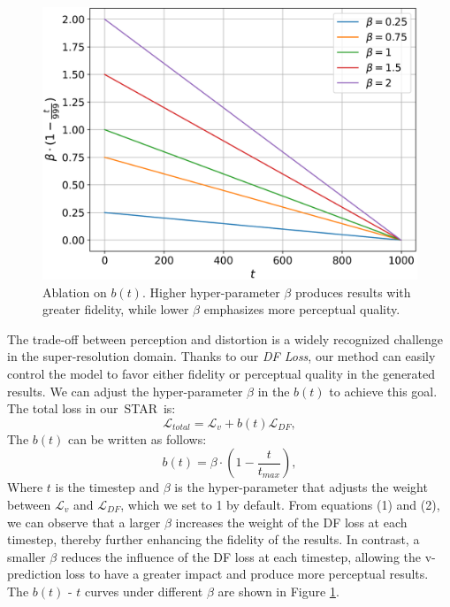 \documentclass[10pt,twocolumn,letterpaper,table]{article}
\newcommand{\name}{STAR}
\begin{document}
\begin{figure}[b]
    \centering
    \includegraphics[width=1\linewidth]{figure_of_supp/bt_ablation.png}
    \caption{Ablation on $b(t)$. Higher hyper-parameter $\beta$ produces results with greater fidelity, while lower $\beta$ emphasizes more perceptual quality.}
    \label{fig:bt_ablation}
\end{figure}

The trade-off between perception and distortion \cite{blau2018perception} is a widely recognized challenge in the super-resolution domain. Thanks to our \textit{DF Loss}, our method can easily control the model to favor either fidelity or perceptual quality in the generated results. We can adjust the hyper-parameter $\beta$ in the $b(t)$ to achieve this goal. The total loss in our~\name~is:
\begin{equation}
    \mathcal{L}_{total} = \mathcal{L}_{v} + b(t)\mathcal{L}_{DF},
\end{equation}
The $b(t)$ can be written as follows:
\begin{equation}
    b(t) = \beta \cdot (1 - \frac{t}{t_{max}}),
\end{equation}
Where \( t \) is the timestep and \( \beta \) is the hyper-parameter that adjusts the weight between \( \mathcal{L}_v \) and \( \mathcal{L}_{DF} \), which we set to 1 by default. From equations (1) and (2), we can observe that a larger \( \beta \) increases the weight of the DF loss at each timestep, thereby further enhancing the fidelity of the results. In contrast, a smaller \( \beta \) reduces the influence of the DF loss at each timestep, allowing the v-prediction loss to have a greater impact and produce more perceptual results. The $b(t)$ - $t$ curves under different $\beta$ are shown in Figure \ref{fig:bt_ablation}. 
\end{document}
